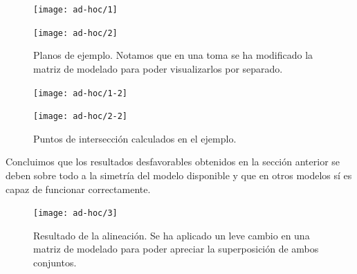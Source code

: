\begin{figure}[h!]
	\begin{minipage}{0.5\textwidth}
		\centering
		\texttt{[image: ad-hoc/1]} 
	\end{minipage}
	\begin{minipage}{0.5\textwidth}
		\centering
		\texttt{[image: ad-hoc/2]} 
	\end{minipage}
	\caption{Planos de ejemplo. Notamos que en una toma se ha modificado la matriz de modelado\footnotemark \hspace{0.5mm}  para poder visualizarlos por separado.}
	\label{fig:ad-hoc}
\end{figure}
\begin{figure}[h!]
	\begin{minipage}{0.5\textwidth}
		\centering
		\texttt{[image: ad-hoc/1-2]} 
	\end{minipage}
	\begin{minipage}{0.5\textwidth}
		\centering
		\texttt{[image: ad-hoc/2-2]} 
	\end{minipage}
	\caption{Puntos de intersección calculados en el ejemplo.}
	\label{fig:ad-hoc2}
\end{figure}


Concluimos que los resultados desfavorables obtenidos en la sección anterior se deben sobre todo a la simetría del modelo disponible y que en otros modelos sí es capaz de funcionar correctamente.
\newpage
\begin{figure}[H]
	\centering
	\texttt{[image: ad-hoc/3]} 
	\caption{Resultado de la alineación. Se ha aplicado un leve cambio en una matriz de modelado para poder apreciar la superposición de ambos conjuntos.}
	\label{fig:ad-hoc3}
\end{figure}
